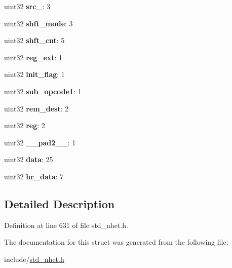 \begin{DoxyCompactItemize}
\mbox{\label{structAND__format_a89651de1d3200051d36f69f695fc6cf4}} 
uint32 {\bfseries src\+\_}\+: 3
\item 
\mbox{\label{structAND__format_ad34850e613b808d9dbff354b6004829e}} 
uint32 {\bfseries shft\+\_\+mode}\+: 3
\item 
\mbox{\label{structAND__format_a766433caf02301c12a92a770f8125c6d}} 
uint32 {\bfseries shft\+\_\+cnt}\+: 5
\item 
\mbox{\label{structAND__format_aa4988c0ec462362c70b6e22bac26b178}} 
uint32 {\bfseries reg\+\_\+ext}\+: 1
\item 
\mbox{\label{structAND__format_ae6cd0a9d4fa8c70378dfeb5c441b7dd3}} 
uint32 {\bfseries init\+\_\+flag}\+: 1
\item 
\mbox{\label{structAND__format_aca7993d193cfd0f6a9a110a139de6d6e}} 
uint32 {\bfseries sub\+\_\+opcode1}\+: 1
\item 
\mbox{\label{structAND__format_aed8653b8af00fa4f72219849366f63c2}} 
uint32 {\bfseries rem\+\_\+dest}\+: 2
\item 
\mbox{\label{structAND__format_ace437bfc281f9fa4bab2fe8f5a3145a9}} 
uint32 {\bfseries reg}\+: 2
\item 
\mbox{\label{structAND__format_ae87fc6b3779d97c3b38604ce22935502}} 
uint32 {\bfseries \+\_\+\+\_\+pad2\+\_\+\+\_\+}\+: 1
\item 
\mbox{\label{structAND__format_a1ae8022ce2c9b7bb705ab21af3959ae9}} 
uint32 {\bfseries data}\+: 25
\item 
\mbox{\label{structAND__format_a668d63b64a196ff292a01c020947cc23}} 
uint32 {\bfseries hr\+\_\+data}\+: 7
\end{DoxyCompactItemize}


\subsection{Detailed Description}


Definition at line 631 of file std\+\_\+nhet.\+h.



The documentation for this struct was generated from the following file\+:\begin{DoxyCompactItemize}
\item 
include/\mbox{\hyperlink{std__nhet_8h}{std\+\_\+nhet.\+h}}\end{DoxyCompactItemize}
